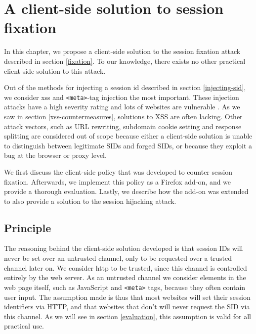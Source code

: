 \chapter{A client-side solution to session fixation}\label{fixation-solution}

In this chapter, we propose a client-side solution to the \gls{session fixation} attack described in section \ref{fixation}. To our knowledge, there exists no other practical client-side solution to this attack.



Out of the methods for injecting a \gls{session id} described in section \ref{injecting-sid}, we consider \gls{xss} and \texttt{<meta>}-tag injection the most important. These injection attacks have a high severity rating \cite{Williams2010} and lots of websites are vulnerable \cite{Brown2010}. As we saw in section \ref{xss-countermeasures}, solutions to XSS are often lacking. Other attack vectors, such as URL rewriting, subdomain cookie setting and response splitting are considered out of scope because either a client-side solution is unable to distinguish between legitimate SIDs and forged SIDs, or because they exploit a bug at the browser or proxy level.


We first discuss the client-side policy that was developed to counter session fixation. Afterwards, we implement this policy as a Firefox add-on, and we provide a thorough evaluation. Lastly, we describe how the add-on was extended to also provide a solution to the session hijacking attack.

\section{Principle}

The reasoning behind the client-side solution developed is that session IDs will never be set over an untrusted channel, only to be requested over a trusted channel later on. We consider \gls{http} to be trusted, since this channel is controlled entirely by the web server. As an untrusted channel we consider elements in the web page itself, such as JavaScript and \texttt{<meta>} tags, because they often contain user input. The assumption made is thus that most websites will set their session identifiers via HTTP, and that websites that don't will never request the SID via this channel. As we will see in section \ref{evaluation}, this assumption is valid for all practical use.

